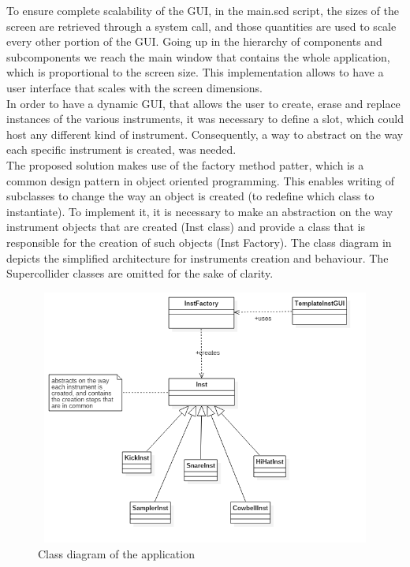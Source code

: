 \documentclass[main.tex]{subfiles}
\begin{document}
To ensure complete scalability of the GUI, in the main.scd script, the sizes of the screen are retrieved through a system call, and those quantities are used to scale every other portion of the GUI. Going up in the hierarchy of components and subcomponents we reach the main window that contains the whole application, which is proportional to the screen size. This implementation allows to have a user interface that scales with the screen dimensions.\\
[2mm]
In order to have a dynamic GUI, that allows the user to create, erase and replace instances of the various instruments, it was necessary to define a slot, which could host any different kind of instrument. Consequently, a way to abstract on the way each specific instrument is created, was needed.\\ 
The proposed solution makes use of the factory method patter, which is a common design pattern in object oriented programming. This enables writing of subclasses to change the way an object is created (to redefine which class to instantiate)\cite{DesignPattern:Gamma}. 
To implement it, it is necessary to make an abstraction on the way instrument objects that are created (Inst class) and provide a class that is responsible for the creation of such objects (Inst Factory).
The class diagram in  depicts the simplified architecture for instruments creation and behaviour. The Supercollider classes are omitted for the sake of clarity.\\
\begin{figure}[htbp]
\centering
\includegraphics[height=8.4cm, width=16cm, keepaspectratio]{images/factory_pattern_uml.png}
\caption{Class diagram of the application}
\label{fig:uml}
\end{figure}
\end{document}
